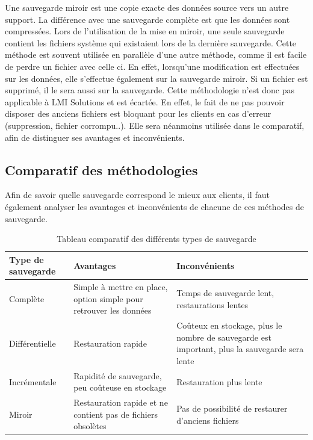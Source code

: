 \documentclass[pfe]{tnreport} %
\begin{document}
Une sauvegarde miroir est une copie exacte des données source vers un autre support. La différence avec une sauvegarde complète est que les données sont compressées. \newline
Lors de l'utilisation de la mise en miroir, une seule sauvegarde contient les fichiers système qui existaient lors de la dernière sauvegarde. \newline Cette méthode est souvent utilisée en parallèle d'une autre méthode, comme il est facile de perdre un fichier avec celle ci. En effet, lorsqu'une modification est effectuées sur les données, elle s'effectue également sur la sauvegarde miroir. Si un fichier est supprimé, il le sera aussi sur la sauvegarde.  \newline
Cette méthodologie n'est donc pas applicable à LMI Solutions et est écartée. \newline
En effet, le fait de ne pas pouvoir disposer des anciens fichiers est bloquant pour les clients en cas d'erreur (suppression, fichier corrompu..). \newline
Elle sera néanmoins utilisée dans le comparatif, afin de distinguer ses avantages et inconvénients. \newpage

\subsection{Comparatif des méthodologies}

Afin de savoir quelle sauvegarde correspond le mieux aux clients, il faut également analyser les avantages et inconvénients de chacune de ces méthodes de sauvegarde.

\begin{table}[!h]
 \centering
 \begin{tabular}{|p{4cm}|p{6cm}|p{6cm}|}
 \hline
 Type de sauvegarde & Avantages & Inconvénients\\
 \hline
 Complète & Simple à mettre en place, option simple pour retrouver les données & Temps de sauvegarde lent, restaurations lentes\\
 \hline
 Différentielle & Restauration rapide & Coûteux en stockage, plus le nombre de sauvegarde est important, plus la sauvegarde sera lente \\ 
 \hline
 Incrémentale & Rapidité de sauvegarde, peu coûteuse en stockage & Restauration plus lente \\
 \hline Miroir & Restauration rapide et ne contient pas de fichiers obsolètes & Pas de possibilité de restaurer d'anciens fichiers \\
 \hline 
 \end{tabular}
 \caption{Tableau comparatif des différents types de sauvegarde}
 \label{tab:comparatif_type}
\end{table}
\end{document}
